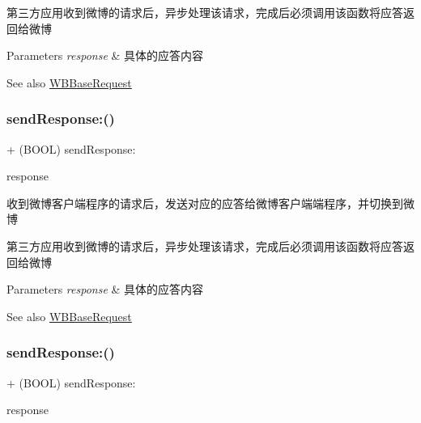第三方应用收到微博的请求后，异步处理该请求，完成后必须调用该函数将应答返回给微博


\begin{DoxyParams}{Parameters}
{\em response} & 具体的应答内容 \\
\hline
\end{DoxyParams}
\begin{DoxySeeAlso}{See also}
\mbox{\hyperlink{interface_w_b_base_request}{W\+B\+Base\+Request}} 
\end{DoxySeeAlso}
\mbox{\label{interface_weibo_s_d_k_af0a51ae27b64cf65bba05a1ea9c5d6e5}} 
\subsubsection{\texorpdfstring{send\+Response\+:()}{sendResponse:()}\hspace{0.1cm}{\footnotesize\ttfamily [2/3]}}
{\footnotesize\ttfamily + (B\+O\+OL) send\+Response\+: \begin{DoxyParamCaption}\item[{(\mbox{\hyperlink{interface_w_b_base_response}{W\+B\+Base\+Response}} $\ast$)}]{response }\end{DoxyParamCaption}}

收到微博客户端程序的请求后，发送对应的应答给微博客户端端程序，并切换到微博

第三方应用收到微博的请求后，异步处理该请求，完成后必须调用该函数将应答返回给微博


\begin{DoxyParams}{Parameters}
{\em response} & 具体的应答内容 \\
\hline
\end{DoxyParams}
\begin{DoxySeeAlso}{See also}
\mbox{\hyperlink{interface_w_b_base_request}{W\+B\+Base\+Request}} 
\end{DoxySeeAlso}
\mbox{\label{interface_weibo_s_d_k_af0a51ae27b64cf65bba05a1ea9c5d6e5}} 
\subsubsection{\texorpdfstring{send\+Response\+:()}{sendResponse:()}\hspace{0.1cm}{\footnotesize\ttfamily [3/3]}}
{\footnotesize\ttfamily + (B\+O\+OL) send\+Response\+: \begin{DoxyParamCaption}\item[{(\mbox{\hyperlink{interface_w_b_base_response}{W\+B\+Base\+Response}} $\ast$)}]{response }\end{DoxyParamCaption}}

